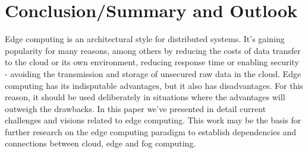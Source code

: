 \section{Conclusion/Summary and Outlook}\label{sec:conclusions}


Edge computing is an architectural style for distributed systems. It's gaining popularity for many reasons, among others by reducing the costs of data transfer to the cloud or its own environment, reducing response time or enabling security - avoiding the transmission and storage of unsecured raw data in the cloud. Edge computing has its indisputable advantages, but it also has disadvantages. For this reason, it should be used deliberately in situations where the advantages will outweigh the drawbacks. In this paper we've presented in detail current challenges and visions related to edge computing. This work may be the basis for further research on the edge computing paradigm to establish dependencies and connections between cloud, edge and fog computing.


